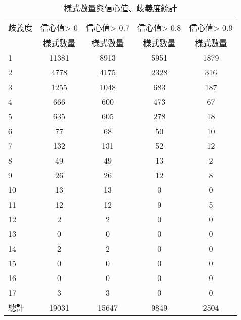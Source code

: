 \begin{table}[t]
    \begin{center}
        \small
        \begin{tabular}{l||c|c|c|c}
        \hline
        歧義度 & 信心值> 0 & 信心值> 0.7 & 信心值> 0.8 & 信心值> 0.9\\
          & 樣式數量 & 樣式數量 & 樣式數量 & 樣式數量 \\
        \hline
        1 & 11381 & 8913 & 5951 & 1879 \\
        2 & 4778 & 4175 & 2328 & 316 \\
        3 & 1255 & 1048 & 683 & 187 \\
        4 & 666 & 600 & 473 & 67 \\
        5 & 635 & 605 & 278 & 18 \\
        6 & 77 & 68 & 50 & 10 \\
        7 & 132 & 131 & 52 & 12 \\
        8 & 49 & 49 & 13 & 2 \\
        9 & 26 & 26 & 12 & 8 \\
        10 & 13 & 13 & 0 & 0 \\
        11 & 12 & 12 & 9 & 5 \\
        12 & 2 & 2 & 0 & 0 \\
        13 & 0 & 0 & 0 & 0 \\
        14 & 2 & 2 & 0 & 0 \\
        15 & 0 & 0 & 0 & 0 \\
        16 & 0 & 0 & 0 & 0 \\
        17 & 3 & 3 & 0 & 0 \\
        \hline
        總計 & 19031 & 15647 & 9849 & 2504 \\
        \hline
        \end{tabular}
        \caption{樣式數量與信心值、歧義度統計}
        \label{t:yago-degree}
    \end{center}
\end{table}
